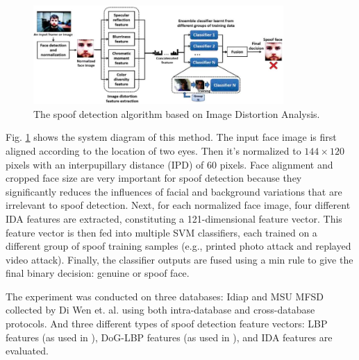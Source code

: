 \documentclass[journal]{IEEEtran}
\begin{document}
\begin{figure}[htbp]
\centering
\includegraphics[width=0.85\textwidth]{img/IDA_system.PNG}
\caption{The spoof detection algorithm based on Image Distortion Analysis.}
\label{lda_system}
\end{figure}
Fig. \ref{lda_system} shows the system diagram of this method. The input face image is first aligned according to the location of two eyes. Then it's normalized to $144\times 120$ pixels with an interpupillary distance (IPD) of 60 pixels. Face alignment and cropped face size are very important for spoof detection because they significantly reduces the influences of facial and background variations that are irrelevant to spoof detection. Next, for each normalized face image, four different IDA features are extracted, constituting a 121-dimensional feature vector. This feature vector is then fed into multiple SVM classifiers, each trained on a different group of spoof training samples (e.g., printed photo attack and replayed video attack). Finally, the classifier outputs are fused using a min rule \cite{jain2005score} to give the final binary decision: genuine or spoof face.

The experiment was conducted on three databases: Idiap and MSU MFSD collected by Di Wen et. al. using both intra-database and cross-database protocols. And three different types of spoof detection feature vectors: LBP features (as used in \cite{maatta2011face}), DoG-LBP features (as used in \cite{kose2012classification}), and IDA features are evaluated.
\end{document}
